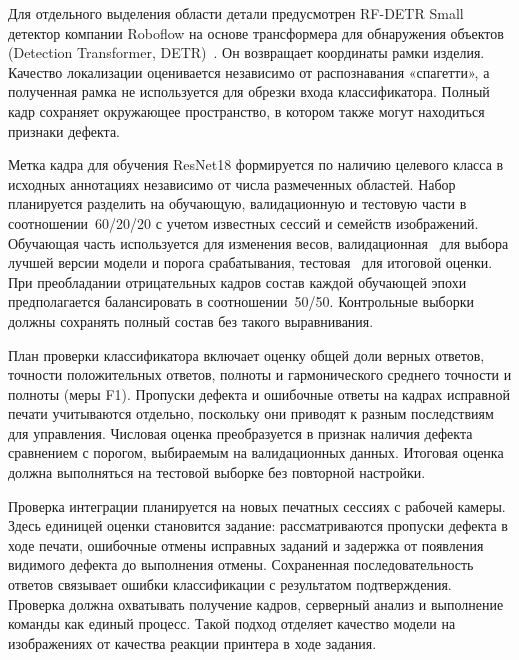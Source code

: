 Для отдельного выделения области детали предусмотрен RF-DETR Small~\textemdash{} детектор компании Roboflow на основе трансформера для обнаружения объектов (Detection Transformer, DETR)~\cite{robinson2026rfdetr}. Он возвращает координаты рамки изделия. Качество локализации оценивается независимо от распознавания «спагетти», а полученная рамка не используется для обрезки входа классификатора. Полный кадр сохраняет окружающее пространство, в котором также могут находиться признаки дефекта.

Метка кадра для обучения ResNet18 формируется по наличию целевого класса в исходных аннотациях независимо от числа размеченных областей. Набор планируется разделить на обучающую, валидационную и тестовую части в соотношении~60/20/20 с учетом известных сессий и семейств изображений. Обучающая часть используется для изменения весов, валидационная~\textemdash{} для выбора лучшей версии модели и порога срабатывания, тестовая~\textemdash{} для итоговой оценки. При преобладании отрицательных кадров состав каждой обучающей эпохи предполагается балансировать в соотношении~50/50. Контрольные выборки должны сохранять полный состав без такого выравнивания.

План проверки классификатора включает оценку общей доли верных ответов, точности положительных ответов, полноты и гармонического среднего точности и полноты (меры F1). Пропуски дефекта и ошибочные ответы на кадрах исправной печати учитываются отдельно, поскольку они приводят к разным последствиям для управления. Числовая оценка преобразуется в признак наличия дефекта сравнением с порогом, выбираемым на валидационных данных. Итоговая оценка должна выполняться на тестовой выборке без повторной настройки.

Проверка интеграции планируется на новых печатных сессиях с рабочей камеры. Здесь единицей оценки становится задание: рассматриваются пропуски дефекта в ходе печати, ошибочные отмены исправных заданий и задержка от появления видимого дефекта до выполнения отмены. Сохраненная последовательность ответов связывает ошибки классификации с результатом подтверждения. Проверка должна охватывать получение кадров, серверный анализ и выполнение команды как единый процесс. Такой подход отделяет качество модели на изображениях от качества реакции принтера в ходе задания.
